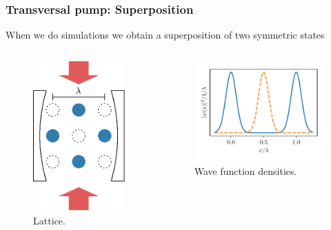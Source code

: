 \documentclass[pdflatex,compress]{beamer}
\begin{document}
\begin{frame}
\frametitle{Transversal pump: Superposition}
When we do simulations we obtain a superposition of two symmetric states
\begin{columns}
\vspace*{-4mm}
\begin{figure}
\centering
\includegraphics[width=.5\textwidth]{images/lattice_drawing_blue.eps}
\vspace*{-2mm}
\caption{Lattice.}
\end{figure}
\begin{figure}
\centering
\includegraphics[width=1\textwidth]{images/density_superposition.pdf}
\vspace*{-10mm}
\caption{Wave function densities.}
\end{figure}
\end{columns}
\end{frame}
\end{document}
